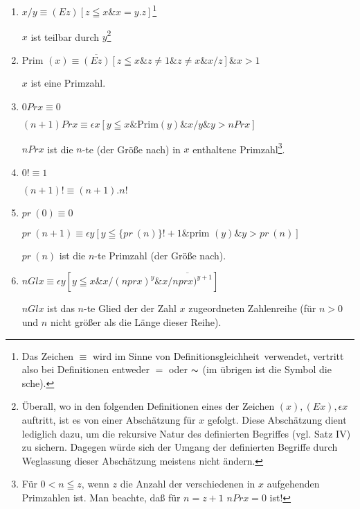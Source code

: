 \documentclass{scrartcl}
\newcommand{\fnvierunddreissiga}{34a}
\begin{document}
\begin{enumerate}[1.]
	\item $x/y \equiv (Ez) [z \leqq x \& x = y.z]$\footnote{Das Zeichen $\equiv$ wird im Sinne von \glqq Definitionsgleichheit\grqq\ verwendet, vertritt also bei Definitionen entweder $=$ oder $\thicksim$ (im übrigen ist
	die Symbol die sche).}

	$x$ ist teilbar durch $y$\footnote{Überall, wo in den folgenden Definitionen eines der Zeichen $(x), (Ex), \epsilon x$ auftritt, ist es von einer Abschätzung für $x$ gefolgt. Diese Abschätzung dient lediglich dazu, um die rekursive Natur des definierten Begriffes (vgl. Satz IV) zu sichern. Dagegen würde sich der Umgang der definierten Begriffe durch Weglassung dieser Abschätzung meistens nicht ändern.}

	\item $\text{Prim }(x) \equiv \overline{(Ez)} [z \leqq x \& z \not = 1 \& z \not = x \& x/z] \& x > 1$

	$x$ ist eine Primzahl.

	\item $0 Pr x \equiv 0$

	$(n + 1) Pr x \equiv \epsilon x [y \leqq x \& \text{Prim}(y) \& x/y \& y > n Pr x]$
	\let\originalfootnote=\thefootnote
	\let\thefootnote=\fnvierunddreissiga

	$n Prx$ ist die $n$-te (der Größe nach) in $x$ enthaltene Primzahl\footnote{Für $0 < n \leqq z$, wenn $z$ die Anzahl der verschiedenen in $x$ aufgehenden Primzahlen ist. Man beachte, daß für $n = z + 1$ \hspace{0.5cm} $n Pr x = 0$ ist!}.
	\let\thefootnote=\originalfootnote
	\setcounter{footnote}{35}

	\item $0! \equiv 1$

	$(n + 1)! \equiv (n + 1).n!$

	\item $pr\ (0) \equiv 0$

	$pr\ (n + 1) \equiv \epsilon y [y \leqq \{ pr\ (n) \}! + 1 \& \text{prim }(y) \& y > pr\ (n)] $

	$pr\ (n)$ ist die $n$-te Primzahl (der Größe nach).

	\item $n Gl x \equiv \epsilon y [y \leqq x \& x/(n pr x)^y \& \overline{x/n pr x)^{y + 1}}]$

	$n Gl x$ ist das $n$-te Glied der der Zahl $x$
	zugeordneten Zahlenreihe (für $n > 0$ und $n$ nicht
	größer als die Länge dieser Reihe).


\end{enumerate}
\end{document}

